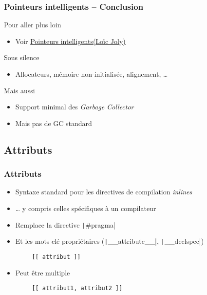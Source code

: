 \documentclass[C++.tex]{subfiles}
\begin{document}
\begin{frame}[fragile]
	\frametitle{Pointeurs intelligents -- Conclusion}
	\begin{block}{Pour aller plus loin}
		\begin{itemize}
			\item Voir \href{http://loic-joly.developpez.com/tutoriels/cpp/smart-pointers/}{Pointeurs intelligents\linklogo (Loïc Joly)}
		\end{itemize}
	\end{block}

	\begin{block}{Sous silence}
		\begin{itemize}
			\item Allocateurs, mémoire non-initialisée, alignement, \ldots{}
		\end{itemize} 
	\end{block}

	\begin{block}{Mais aussi}
		\begin{itemize}
			\item Support minimal des \textit{Garbage Collector}


			\item Mais pas de GC standard
		\end{itemize}
	\end{block}
\end{frame}

\subsection*{Attributs}
\begin{frame}[fragile]
	\frametitle{Attributs}
	\begin{itemize}
		\item Syntaxe standard pour les directives de compilation \textit{inlines}
		\item \ldots{} y compris celles spécifiques à un compilateur
		\item Remplace la directive \texttt|#pragma|
		\item Et les mots-clé propriétaires (\texttt|__attribute__|, \texttt|__declspec|)
	\end{itemize}

	\begin{verbatim}
		[[ attribut ]]
	\end{verbatim}

	\begin{itemize}
		\item Peut être multiple
	\end{itemize}

	\begin{verbatim}
		[[ attribut1, attribut2 ]]
	\end{verbatim}

\end{frame}
\end{document}
